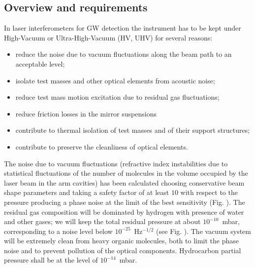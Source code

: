 \subsection{Overview and requirements}
\label{Sec:Vacuum:Intro}
In laser interferometers for GW detection the instrument has to be kept under High-Vacuum or Ultra-High-Vacuum (HV, UHV) for several reasons: 
\begin{itemize} 
\item reduce the noise due to vacuum fluctuations along the beam path to an acceptable level; 
\item isolate test masses and other optical elements from acoustic noise; 
\item reduce test mass motion excitation due to residual gas fluctuations;
\item reduce friction losses in the mirror suspensions \item contribute to thermal isolation of test masses and of their support structures; 
\item contribute to preserve the cleanliness of optical elements. 
\end{itemize} 

The noise due to vacuum fluctuations (refractive index instabilities due to statistical fluctuations of the number of molecules in the volume occupied by the laser beam in the arm cavities) has been calculated choosing conservative beam shape parameters and taking a safety factor of at least $10$ with respect to the pressure producing a phase noise at the limit of the best sensitivity (Fig. 
). The residual gas composition will be dominated by hydrogen with presence of water and other gases; we will keep the total residual pressure at about $10^{-10}$~mbar, corresponding to a noise level below $10^{-25}$~Hz$^{-1/2}$ (see Fig. %
). The vacuum system will be extremely clean from heavy organic molecules, both to limit the phase noise and to prevent pollution of the optical components. Hydrocarbon partial pressure shall be at the level of $10^{-14}$~mbar. %

